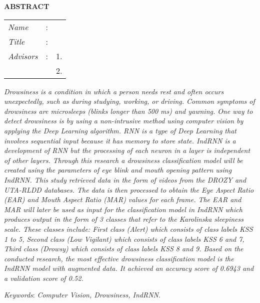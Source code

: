 \begin{center}
  \large\textbf{ABSTRACT}
\end{center}


\vspace{2ex}

\begingroup
\setlength{\tabcolsep}{0pt}

\noindent
\begin{tabularx}{\textwidth}{l >{\centering}m{3em} X}
  \emph{Name}     & : & \name{}         \\

  \emph{Title}    & : & \engtatitle{}   \\

  \emph{Advisors} & : & 1. \advisor{}   \\
                  &   & 2. \coadvisor{} \\
\end{tabularx}
\endgroup

\emph{Drowsiness is a condition in which a person needs rest and often occurs unexpectedly, 
such as during studying, working, or driving. Common symptoms of drowsiness are microsleeps
(blinks longer than 500 ms) and yawning. One way to detect drowsiness is by using a non-intrusive
method using computer vision by applying the Deep Learning algorithm. RNN is a type of Deep
Learning that involves sequential input because it has memory to store state. IndRNN is a 
development of RNN but the processing of each neuron in a layer is independent of other layers.
Through this research a drowsiness classification model will be created using the parameters
of eye blink and mouth opening pattern using IndRNN. This study retrieved data in the form of
videos from the DROZY and UTA-RLDD databases. The data is then processed to obtain the Eye
Aspect Ratio (EAR) and Mouth Aspect Ratio (MAR) values for each frame. The EAR and MAR will
later be used as input for the classification model in IndRNN which produces output in the
form of 3 classes that refer to the Karolinska sleepiness scale. These classes include: First
class (Alert) which consists of class labels KSS 1 to 5, Second class (Low Vigilant) which
consists of class labels KSS 6 and 7, Third class (Drowsy) which consists of class labels
KSS 8 and 9. Based on the conducted research, the most effective drowsiness classification model 
is the IndRNN model with augmented data. It achieved an accuracy score of 0.6943 and a validation 
score of 0.52.}

\emph{Keywords}: \emph{Computer Vision, Drowsiness, IndRNN}.

